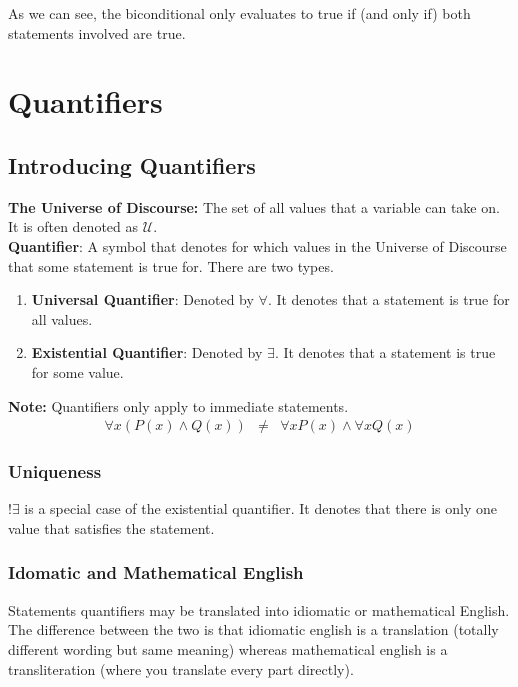 \documentclass{article}
\begin{document}
As we can see, the biconditional only evaluates to true if (and only if) both statements
involved are true.

\section{Quantifiers}
\subsection{Introducing Quantifiers}
\textbf{The Universe of Discourse:} The set of all values that a variable can take on. It is often denoted as $\mathcal{U}$. \\

\noindent \textbf{Quantifier}: A symbol that denotes for which values in the Universe of Discourse that some statement is true for. 
There are two types.
\begin{enumerate}
    \item \textbf{Universal Quantifier}: Denoted by $\forall$. It denotes that a statement is true for all values.
    \item \textbf{Existential Quantifier}: Denoted by $\exists$. It denotes that a statement is true for some value.
\end{enumerate}

\noindent \textbf{Note:} Quantifiers only apply to immediate statements.
\begin{eqnarray} \nonumber
    \forall x (P(x) \land Q(x)) &\neq& \forall x P(x) \land \forall x Q(x) 
\end{eqnarray}

\subsubsection{Uniqueness}
$!\exists$ is a special case of the existential quantifier. It denotes that there is only
one value that satisfies the statement.

\subsubsection{Idomatic and Mathematical English}
Statements quantifiers may be translated into idiomatic or mathematical English.
The difference between the two is that idiomatic english is a translation (totally
different wording but same meaning) whereas mathematical english is a transliteration
(where you translate every part directly). \\
\end{document}
